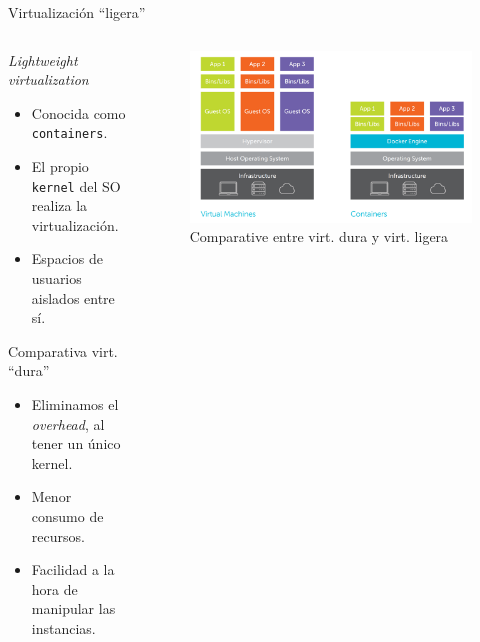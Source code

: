 \documentclass[aspectratio=169,xcolor=dvipsnames]{beamer}
\begin{document}
	\begin{frame}{Virtualización ``ligera''}
	\begin{columns}
	\begin{column}{0.4\textwidth}
	    \begin{block}{\textit{Lightweight virtualization}}
	        \begin{itemize}
	            \item Conocida como \texttt{containers}.
	            \item El propio \texttt{kernel} del SO realiza la virtualización.
	            \item Espacios de usuarios aislados entre sí.
	        \end{itemize}
	    \end{block}
	    
	    \begin{exampleblock}{Comparativa virt. ``dura''}
	        \begin{itemize}
	            \item Eliminamos el \textit{overhead}, al tener un único kernel.
	            \item Menor consumo de recursos.
	            \item Facilidad a la hora de manipular las instancias.
	        \end{itemize}
	    \end{exampleblock}
	\end{column}
	
	\begin{column}{0.6\textwidth}
	    \begin{figure}
            \includegraphics[width=1\textwidth]{img/virtualization_comparative_2.png}
            \caption{Comparative entre virt. dura y virt. ligera}
       \end{figure}
	\end{column}
	
	\end{columns}
	\end{frame}
	
\end{document}
